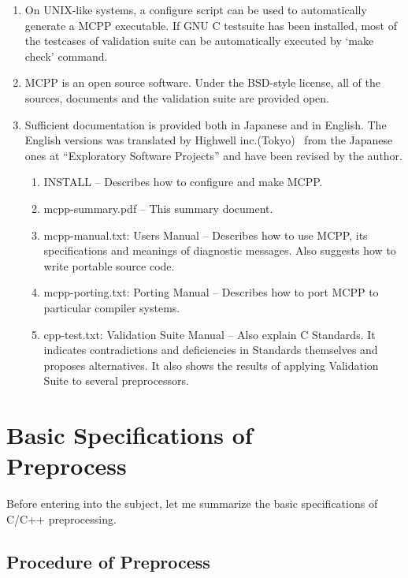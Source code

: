 \documentclass[twocolumn]{article}
\begin{document}
\begin{enumerate}
\item On UNIX-like systems, a configure script can be used to automatically generate a MCPP executable.  If GNU C testsuite has been installed, most of the testcases of validation suite can be automatically executed by `make check' command.

\item MCPP is an open source software.  Under the BSD-style license, all of the sources, documents and the validation suite are provided open.

\item Sufficient documentation is provided both in Japanese and in English.  The English versions was translated by Highwell inc.(Tokyo)~\cite{hw} from the Japanese ones at ``Exploratory Software Projects'' and have been revised by the author.

    \begin{enumerate}
    \item INSTALL -- Describes how to configure and make MCPP.
    \item mcpp-summary.pdf -- This summary document.
    \item mcpp-manual.txt: Users Manual -- Describes how to use MCPP, its specifications and meanings of diagnostic messages.  Also suggests how to write portable source code.
    \item mcpp-porting.txt: Porting Manual -- Describes how to port MCPP to particular compiler systems.
    \item cpp-test.txt: Validation Suite Manual -- Also explain C Standards.  It indicates contradictions and deficiencies in Standards themselves and proposes alternatives.  It also shows the results of applying Validation Suite to several preprocessors.
    \end{enumerate}

\end{enumerate}

\section{Basic Specifications of\\
Preprocess}

Before entering into the subject, let me summarize the basic specifications of C/C++ preprocessing.

\subsection{Procedure of Preprocess}
\end{document}
